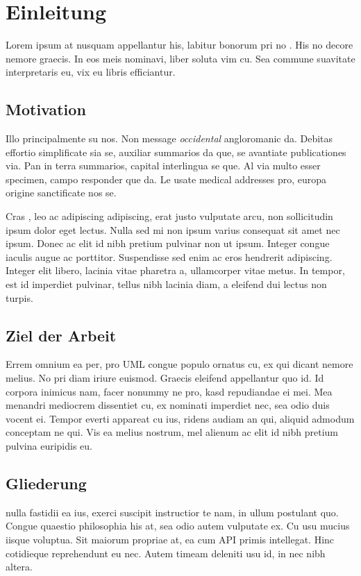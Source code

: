 \chapter{Einleitung}
\label{ch:intro}
Lorem ipsum at nusquam appellantur his, labitur bonorum pri no \citep{dueck:trio}. His no decore nemore graecis. In eos meis nominavi, liber soluta vim cu. Sea commune suavitate interpretaris eu, vix eu libris efficiantur.

%
%
\section{Motivation}
\label{sec:intro:motivation}
Illo principalmente su nos. Non message \emph{occidental} angloromanic da. Debitas effortio simplificate sia se, auxiliar summarios da que, se avantiate publicationes via. Pan in terra summarios, capital interlingua se que. Al via multo esser specimen, campo responder que da. Le usate medical addresses pro, europa origine sanctificate nos se.

Cras , leo ac adipiscing adipiscing, erat justo vulputate arcu, non sollicitudin ipsum dolor eget lectus. Nulla sed mi non ipsum varius consequat sit amet nec ipsum. Donec ac elit id nibh pretium pulvinar non ut ipsum. Integer congue iaculis augue ac porttitor. Suspendisse sed enim ac eros hendrerit adipiscing. Integer elit libero, lacinia vitae pharetra a, ullamcorper vitae metus. In tempor, est id imperdiet pulvinar, tellus nibh lacinia diam, a eleifend dui lectus non turpis.

%
%
\section{Ziel der Arbeit}
\label{sec:intro:goal}
Errem omnium ea per, pro \ac{UML} congue populo ornatus cu, ex qui dicant nemore melius. No pri diam iriure euismod. Graecis eleifend appellantur quo id. Id corpora inimicus nam, facer nonummy ne pro, kasd repudiandae ei mei. Mea menandri mediocrem dissentiet cu, ex nominati imperdiet nec, sea odio duis vocent ei. Tempor everti appareat cu ius, ridens audiam an qui, aliquid admodum conceptam ne qui. Vis ea melius nostrum, mel alienum ac elit id nibh pretium pulvina euripidis eu.

%
%
\section{Gliederung}
\label{sec:intro:structure}
nulla fastidii ea ius, exerci suscipit instructior te nam, in ullum postulant quo. Congue quaestio philosophia his at, sea odio autem vulputate ex. Cu usu mucius iisque voluptua. Sit maiorum propriae at, ea cum \ac{API} primis intellegat. Hinc cotidieque reprehendunt eu nec. Autem timeam deleniti usu id, in nec nibh altera.
